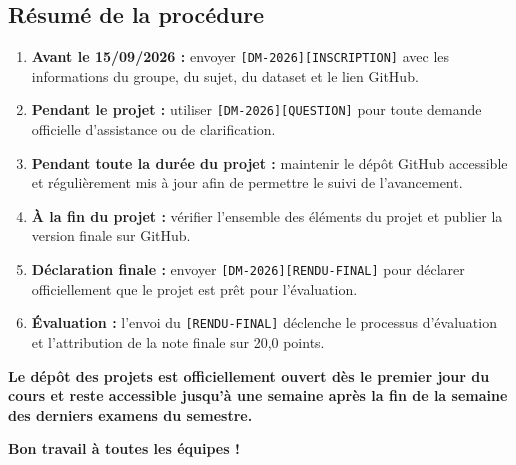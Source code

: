 \documentclass[11pt,a4paper]{article}
\begin{document}
\subsection*{Résumé de la procédure}

\begin{center}
\begin{tcolorbox}[
    width=0.92\textwidth,
    colback=gray!5,
    colframe=gray!60,
    title=\textbf{PROCÉDURE À SUIVRE},
    arc=2mm
]

\begin{enumerate}[leftmargin=*]
    \item \textbf{Avant le 15/09/2026 :}
    envoyer \texttt{[DM-2026][INSCRIPTION]} avec les informations du groupe,
    du sujet, du dataset et le lien GitHub.

    \item \textbf{Pendant le projet :}
    utiliser \texttt{[DM-2026][QUESTION]} pour toute demande officielle
    d’assistance ou de clarification.

    \item \textbf{Pendant toute la durée du projet :}
    maintenir le dépôt GitHub accessible et régulièrement mis à jour afin de
    permettre le suivi de l'avancement.

    \item \textbf{À la fin du projet :}
    vérifier l'ensemble des éléments du projet et publier la version finale
    sur GitHub.

    \item \textbf{Déclaration finale :}
    envoyer \texttt{[DM-2026][RENDU-FINAL]} pour déclarer officiellement
    que le projet est prêt pour l'évaluation.

    \item \textbf{Évaluation :}
    l'envoi du \texttt{[RENDU-FINAL]} déclenche le processus d'évaluation
    et l'attribution de la note finale sur 20,0 points.
\end{enumerate}

\end{tcolorbox}
\end{center}

\vspace{0.3cm}
\begin{tcolorbox}[colback=sintefgold!15, colframe=sintefgold!80!black, title=\textbf{PÉRIODE ET CALENDRIER DE SOUMISSION DES PROJETS}, arc=2mm]
    \centering
    \textbf{Le dépôt des projets est officiellement ouvert dès le premier jour du cours et reste accessible jusqu'à une semaine après la fin de la semaine des derniers examens du semestre.}
\end{tcolorbox}

\vspace{0.5cm}
\begin{center}
    {\color{sintefblue}\Large \bfseries Bon travail à toutes les équipes !}
\end{center}
\end{document}
